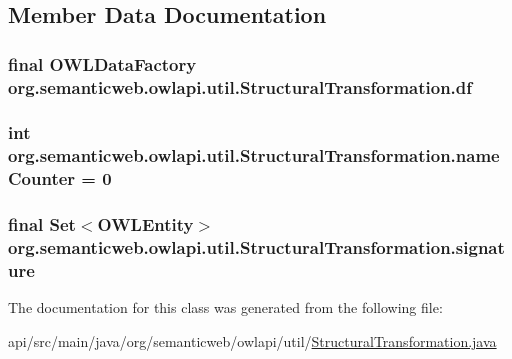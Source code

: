 \subsection{Member Data Documentation}
\hypertarget{classorg_1_1semanticweb_1_1owlapi_1_1util_1_1_structural_transformation_a3d86f23c382a3c4125e62c74fa286c43}{
\subsubsection[{df}]{\setlength{\rightskip}{0pt plus 5cm}final {\bf O\-W\-L\-Data\-Factory} org.\-semanticweb.\-owlapi.\-util.\-Structural\-Transformation.\-df\hspace{0.3cm}{\ttfamily [protected]}}}\label{classorg_1_1semanticweb_1_1owlapi_1_1util_1_1_structural_transformation_a3d86f23c382a3c4125e62c74fa286c43}
\hypertarget{classorg_1_1semanticweb_1_1owlapi_1_1util_1_1_structural_transformation_a8726b11de7ac2b14664148a7cfa38678}{
\subsubsection[{name\-Counter}]{\setlength{\rightskip}{0pt plus 5cm}int org.\-semanticweb.\-owlapi.\-util.\-Structural\-Transformation.\-name\-Counter = 0\hspace{0.3cm}{\ttfamily [private]}}}\label{classorg_1_1semanticweb_1_1owlapi_1_1util_1_1_structural_transformation_a8726b11de7ac2b14664148a7cfa38678}
\hypertarget{classorg_1_1semanticweb_1_1owlapi_1_1util_1_1_structural_transformation_a3acd3e6af970829727c4e68c1db41a85}{
\subsubsection[{signature}]{\setlength{\rightskip}{0pt plus 5cm}final Set$<${\bf O\-W\-L\-Entity}$>$ org.\-semanticweb.\-owlapi.\-util.\-Structural\-Transformation.\-signature\hspace{0.3cm}{\ttfamily [protected]}}}\label{classorg_1_1semanticweb_1_1owlapi_1_1util_1_1_structural_transformation_a3acd3e6af970829727c4e68c1db41a85}


The documentation for this class was generated from the following file\-:\begin{DoxyCompactItemize}
\item 
api/src/main/java/org/semanticweb/owlapi/util/\hyperlink{_structural_transformation_8java}{Structural\-Transformation.\-java}\end{DoxyCompactItemize}
